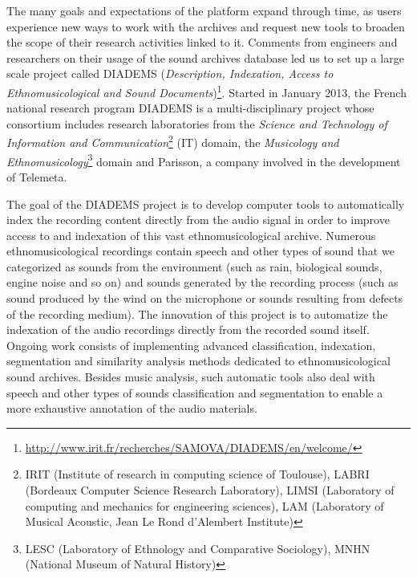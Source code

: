 \documentclass{sig-alternate}
\newcommand{\comment}[1]{\footnote{\color{red} \bf{{#1}}}}
\begin{document}
The many goals and expectations of the platform expand through time, as users experience new ways to work with the archives and request new tools to broaden the scope of their research activities linked to it. Comments from engineers and researchers on their usage of the sound archives database led us to set up a large scale project called DIADEMS (\emph{Description, Indexation, Access to Ethnomusicological and Sound Documents})\footnote{\url{http://www.irit.fr/recherches/SAMOVA/DIADEMS/en/welcome/}}. 
Started in January 2013, the French national research program DIADEMS is a multi-disciplinary project whose consortium includes research laboratories from the \emph{ Science and Technology of Information and Communication}\footnote{IRIT (Institute of research in computing science of Toulouse), LABRI (Bordeaux Computer Science Research Laboratory), LIMSI (Laboratory of computing and mechanics for engineering sciences), LAM (Laboratory of Musical Acoustic, Jean Le Rond d'Alembert Institute)} (IT) domain, the \emph{Musicology and Ethnomusicology}\footnote{LESC (Laboratory of Ethnology and Comparative Sociology), MNHN (National Museum of Natural History)} domain and Parisson, a company involved in the development of Telemeta.
 
The goal of the DIADEMS project is to develop computer tools to automatically index the recording content directly from the audio signal in order to improve access to and indexation of this vast ethnomusicological archive. Numerous ethnomusicological recordings contain speech and other types of sound that we categorized as sounds from the environment (such as rain, biological sounds, engine noise and so on) and sounds generated by the recording process (such as sound produced by the wind on the microphone or sounds resulting from defects of the recording medium). The innovation of this project is to automatize the indexation of the audio recordings directly from the recorded sound itself. Ongoing work consists of implementing advanced classification, indexation, segmentation and similarity analysis methods dedicated to ethnomusicological sound archives.  Besides music analysis, such automatic tools also deal with speech and other types of sounds classification and segmentation to enable a more exhaustive annotation of the audio materials.
\end{document}
